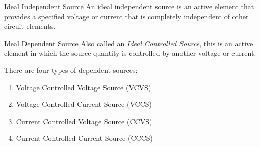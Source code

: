 \documentclass[12pt]{article}
\begin{document}
\begin{definition}{Ideal Independent Source}
  An ideal independent source is an active element that provides a specified voltage or current that is completely independent of other circuit elements.
\end{definition}

\begin{definition}{Ideal Dependent Source}
  Also called an \textit{Ideal Controlled Source}, this is an active element in which the source quantity is controlled by another voltage or current.
\end{definition}


There are four types of dependent sources:
\begin{enumerate}
  \itemsep0em
  \item Voltage Controlled Voltage Source (VCVS)
  \item Voltage Controlled Current Source (VCCS)
  \item Current Controlled Voltage Source (CCVS)
  \item Current Controlled Current Source (CCCS)
\end{enumerate}
\end{document}
